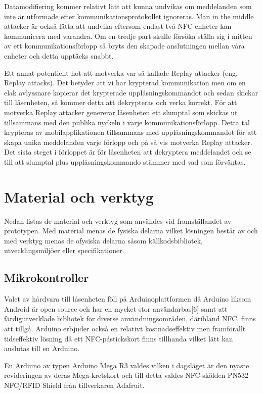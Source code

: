\documentclass[11pt]{article}
\begin{document}
Datamodifiering kommer relativt lätt att kunna undvikas om meddelanden som inte är utformade efter kommunikationsprotokollet ignoreras. Man in the middle attacker är också lätta att undvika eftersom endast två NFC enheter kan kommunicera med varandra. Om en tredje part skulle försöka ställa sig i mitten av ett kommunikationsförlopp så bryts den skapade anslutningen mellan våra enheter och detta upptäcks snabbt. 

Ett annat potentiellt hot att motverka var så kallade Replay attacker (eng. Replay attacks). Det betyder att vi har krypterad kommunikation men om en elak avlyssnare kopierar det krypterade upplåsningskommandot och sedan skickar till låsenheten, så kommer detta att dekrypteras och verka korrekt. För att motverka Replay attacker genererar låsenheten ett slumptal som skickas ut tillsammans med den publika nyckeln i varje kommunikationsförlopp. Detta tal krypteras av mobilapplikationen tillsammans med upplåsningskommandot för att skapa unika meddelanden varje förlopp och på så vis motverka Replay attacker. Det sista steget i förloppet är för låsenheten att dekryptera meddelandet och se till att slumptal plus upplåsningskommando stämmer med vad som förväntas.

\section{Material och verktyg}
Nedan listas de material och verktyg som användes vid framställandet av prototypen. Med material menas de fysiska delarna vilket lösningen består av och med verktyg menas de ofysiska delarna såsom källkodsbibliotek, utvecklingsmiljöer eller specifikationer.

\subsection{Mikrokontroller}
Valet av hårdvara till låsenheten föll på Arduinoplattformen då Arduino liksom Android är open source och har en mycket stor användarbas[6] samt att färdigutvecklade bibliotek för diverse användningsområden, däribland NFC, finns att tillgå. Arduino erbjuder också en relativt kostnadseffektiv men framförallt tidseffektiv lösning då ett NFC-påstickskort finns tillhanda vilket lätt kan anslutas till en Arduino.

En Arduino av typen Arduino Mega R3 valdes vilken i dagsläget är den nyaste revideringen av deras Mega-kretskort och till detta valdes NFC-skölden PN532 NFC/RFID Shield från tillverkaren Adafruit.
\end{document}
